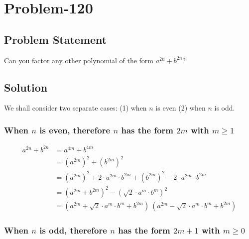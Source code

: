 \documentclass[12pt]{article}
\begin{document}
\section*{Problem-120}
\subsection*{Problem Statement}
Can you factor any other polynomial of the form $a^{2n} + b^{2n}$?

\subsection*{Solution}
We shall consider two separate cases: (1) when $n$ is even (2) when $n$ is odd.

\subsubsection*{When $n$ is even, therefore $n$ has the form $2m$ with $m \geq 1$}

\begin{equation*}
	\begin{aligned}
		a^{2n}+b^{2n} &= a^{4m}+b^{4m}\\
					  &= \left( a^{2m} \right)^2 + \left( b^{2m} \right)^2\\
					  &= \left( a^{2m} \right)^2 + 2\cdot a^{2m}\cdot b^{2m}+ \left( b^{2m} \right)^2 - 2\cdot a^{2m}\cdot b^{2m}\\
					  &= \left( a^{2m}+b^{2m} \right)^2 - \left( \sqrt{2} \cdot a^m \cdot b^m \right)^2\\
					  &= \left( a^{2m}+ \sqrt{2} \cdot a^m \cdot b^m + b^{2m} \right)\ \left( a^{2m} - \sqrt{2} \cdot a^m \cdot b^m + b^{2m} \right)
	\end{aligned}
\end{equation*}

\subsubsection*{When $n$ is odd, therefore $n$ has the form $2m+1$ with $m \geq 0$}
\end{document}
